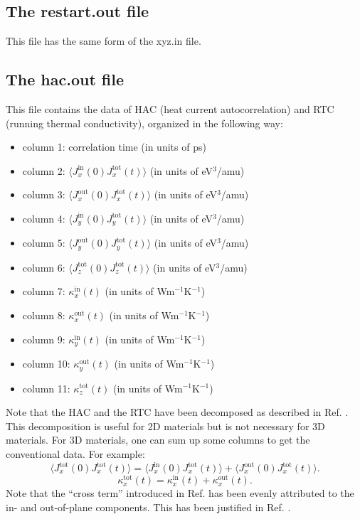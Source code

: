 \documentclass[12pt,a4paper]{report}
\begin{document}
\subsection{The restart.out file}

This file has the same form of the xyz.in file.

\subsection{The hac.out file}

This file contains the data of HAC (heat current autocorrelation) and RTC (running thermal conductivity), organized in the following way:
\begin{itemize}
\item column 1: correlation time (in units of ps)
\item column 2: $\langle J_x^{\text{in}}(0)J_x^{\text{tot}}(t)\rangle$ (in units of eV$^3$/amu)
\item column 3: $\langle J_x^{\text{out}}(0)J_x^{\text{tot}}(t)\rangle$ (in units of eV$^3$/amu)
\item column 4: $\langle J_y^{\text{in}}(0)J_y^{\text{tot}}(t)\rangle$ (in units of eV$^3$/amu)
\item column 5: $\langle J_y^{\text{out}}(0)J_y^{\text{tot}}(t)\rangle$ (in units of eV$^3$/amu)
\item column 6: $\langle J_z^{\text{tot}}(0)J_z^{\text{tot}}(t)\rangle$ (in units of eV$^3$/amu)
\item column 7: $\kappa_x^{\text{in}}(t)$ (in units of Wm$^{-1}$K$^{-1}$)
\item column 8: $\kappa_x^{\text{out}}(t)$ (in units of Wm$^{-1}$K$^{-1}$)
\item column 9: $\kappa_y^{\text{in}}(t)$ (in units of Wm$^{-1}$K$^{-1}$)
\item column 10: $\kappa_y^{\text{out}}(t)$ (in units of Wm$^{-1}$K$^{-1}$)
\item column 11: $\kappa_z^{\text{tot}}(t)$ (in units of Wm$^{-1}$K$^{-1}$)
\end{itemize}

Note that the HAC and the RTC have been decomposed as described in Ref. \cite{fan2017prb}. This decomposition is useful for 2D materials but is not necessary for 3D materials. For 3D materials, one can sum up some columns to get the conventional data. For example:
\begin{equation}
\langle J_x^{\text{tot}}(0)J_x^{\text{tot}}(t) \rangle =
\langle J_x^{\text{in}}(0)J_x^{\text{tot}}(t) \rangle +
\langle J_x^{\text{out}}(0)J_x^{\text{tot}}(t) \rangle.
\end{equation}
\begin{equation}
\kappa_x^{\text{tot}}(t) = \kappa_x^{\text{in}}(t) + \kappa_x^{\text{out}}(t).
\end{equation}
Note that the ``cross term'' introduced in Ref. \cite{fan2017prb} has been evenly attributed to the in- and out-of-plane components. This has been justified in Ref. \cite{fan2018submitted}.
\end{document}
